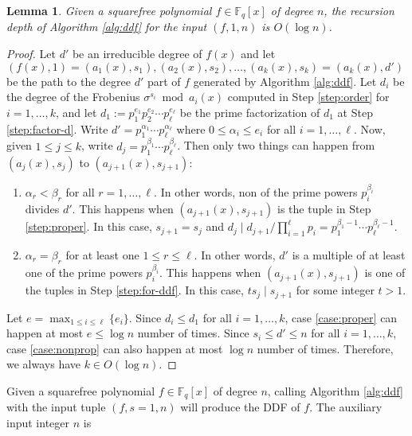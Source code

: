 \documentclass{article}
\theoremstyle{plain}
\newtheorem{lemma}[theorem]{Lemma}
\theoremstyle{definition}
\def\F{\ensuremath{\mathbb{F}}}
\begin{document}
\begin{lemma}
	\label{lem:depth}
	Given a squarefree polynomial $f \in \F_q[x]$ of degree $n$, the recursion depth of Algorithm 
	\ref{alg:ddf} for the input $(f, 1, n)$ is $O(\log n)$.
\end{lemma}
\begin{proof}
	Let $d'$ be an irreducible degree of $f(x)$ and let $(f(x), 1) = (a_1(x), s_1), (a_2(x), s_2), 
	\dots, (a_k(x), s_k) = (a_k(x), d')$ be the path to the degree $d'$ part of $f$ generated by 
	Algorithm \ref{alg:ddf}. Let $d_i$ be the degree of the Frobenius $\sigma^{s_i} \bmod a_i(x)$ 
	computed in Step \ref{step:order} for $i = 1, \dots, k$, and let $d_1 := p_1^{e_1} p_2^{e_2} 
	\cdots p_\ell^{e_\ell}$ be the prime factorization of $d_1$ at Step \ref{step:factor-d}. Write 
	$d' = p_1^{\alpha_1} \cdots p_\ell^{\alpha_\ell}$ where $0 \le \alpha_i \le e_i$ for all $i 
	= 1, \dots, \ell$. Now, given $1 \le j \le k$, write $d_j = p_1^{\beta_1} \cdots 
	p_\ell^{\beta_\ell}$. Then only two things can happen from $(a_j(x), s_j)$ to $(a_{j + 1}(x), 
	s_{j + 1})$:
	\begin{enumerate}
		\item\label{case:proper} $\alpha_r < \beta_r$ for all $r = 1, \dots, \ell$. In other words, 
		non of the prime powers $p_i^{\beta_i}$ divides $d'$. This happens when $(a_{j + 1}(x), s_{j 
		+ 1})$ is the tuple in Step \ref{step:proper}. In this case, $s_{j + 1} = s_j$ and $d_j \mid 
		d_{j + 1} / \prod_{i = 1}^\ell p_i = p_1^{\beta_1 - 1} \cdots p_\ell^{\beta_\ell - 1}$.
		\item\label{case:nonprop} $\alpha_r = \beta_r$ for at least one $1 \le r \le \ell$. In 
		other words, $d'$ is a multiple of at least one of the prime powers $p_i^{\beta_i}$. This 
		happens when $(a_{j + 1}(x), s_{j + 1})$ is one of the tuples in Step \ref{step:for-ddf}. 
		In this case, $ts_j \mid s_{j + 1}$ for some integer $t > 1$. 
	\end{enumerate}
	Let $e = \max_{1 \le i \le \ell}\{ e_i \}$. Since $d_i \le d_1$ for all $i = 1, \dots, k$, case 
	\ref{case:proper} can happen at most $e \le \log n$ number of times. Since $s_i \le d' \le n$ 
	for all $i = 1, \dots, k$, case \ref{case:nonprop} can also happen at most $\log n$ number of 
	times. Therefore, we always have $k \in O(\log n)$. 
\end{proof}
Given a squarefree polynomial $f \in \F_q[x]$ of degree $n$, calling Algorithm \ref{alg:ddf} with 
the input tuple $(f, s = 1, n)$ will produce the DDF of $f$. The auxiliary input integer $n$ is 
\end{document}
